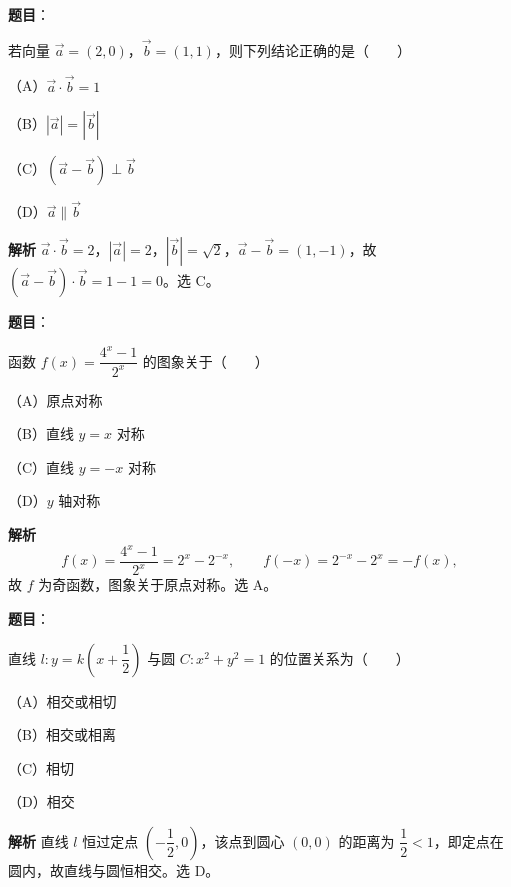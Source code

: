 \begin{answer}

\textbf{题目}：

若向量 $\overrightarrow a=(2,0)$，$\overrightarrow b=(1,1)$，则下列结论正确的是\mbox{（　　）}

（A）$\overrightarrow a\cdot\overrightarrow b=1$

（B）$|\overrightarrow a|=|\overrightarrow b|$

（C）$(\overrightarrow a-\overrightarrow b)\perp\overrightarrow b$

（D）$\overrightarrow a\parallel\overrightarrow b$

\textbf{解析}
$\overrightarrow a\cdot\overrightarrow b=2$，$|\overrightarrow a|=2$，$|\overrightarrow b|=\sqrt2$，$\overrightarrow a-\overrightarrow b=(1,-1)$，故 $(\overrightarrow a-\overrightarrow b)\cdot\overrightarrow b=1-1=0$。选 C。


\end{answer}
\begin{answer}

\textbf{题目}：

函数 $f(x)=\dfrac{4^x-1}{2^x}$ 的图象关于\mbox{（　　）}

（A）原点对称

（B）直线 $y=x$ 对称

（C）直线 $y=-x$ 对称

（D）$y$ 轴对称

\textbf{解析}
\nopagebreak[4]
\[f(x)=\frac{4^x-1}{2^x}=2^x-2^{-x},\qquad f(-x)=2^{-x}-2^x=-f(x),\]
故 $f$ 为奇函数，图象关于原点对称。选 A。


\end{answer}
\begin{answer}

\textbf{题目}：

直线 $l:y=k\left(x+\dfrac12\right)$ 与圆 $C:x^2+y^2=1$ 的位置关系为\mbox{（　　）}

（A）相交或相切

（B）相交或相离

（C）相切

（D）相交

\textbf{解析}
直线 $l$ 恒过定点 $\left(-\dfrac12,0\right)$，该点到圆心 $(0,0)$ 的距离为 $\dfrac12<1$，即定点在圆内，故直线与圆恒相交。选 D。


\end{answer}
